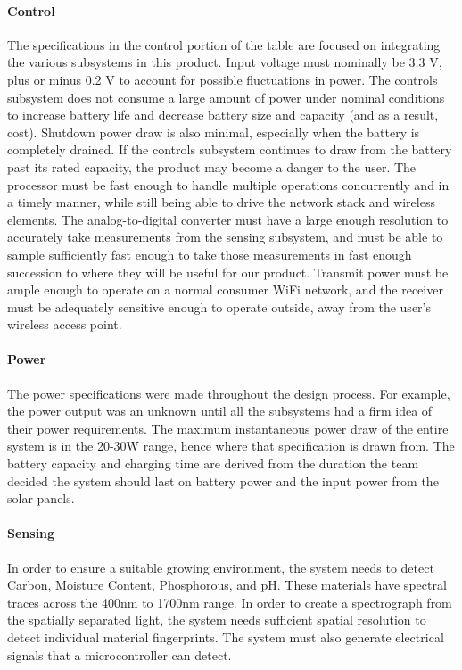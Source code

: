 \paragraph{Control}
The specifications in the control portion of the table are focused on integrating the various subsystems in this product. Input voltage must nominally be 3.3 V, plus or minus 0.2 V to account for possible fluctuations in power. The controls subsystem does not consume a large amount of power under nominal conditions to increase battery life and decrease battery size and capacity (and as a result, cost). Shutdown power draw is also minimal, especially when the battery is completely drained. If the controls subsystem continues to draw from the battery past its rated capacity, the product may become a danger to the user. The processor must be fast enough to handle multiple operations concurrently and in a timely manner, while still being able to drive the network stack and wireless elements. The analog-to-digital converter must have a large enough resolution to accurately take measurements from the sensing subsystem, and must be able to sample sufficiently fast enough to take those measurements in fast enough succession to where they will be useful for our product. Transmit power must be ample enough to operate on a normal consumer WiFi network, and the receiver must be adequately sensitive enough to operate outside, away from the user's wireless access point.

\paragraph{Power}
The power specifications were made throughout the design process. For example, the power output was an unknown until all the subsystems had a firm idea of their power requirements. The maximum instantaneous power draw of the entire system is in the 20-30W range, hence where that specification is drawn from. The battery capacity and charging time are derived from the duration the team decided the system should last on battery power and the input power from the solar panels.

\paragraph{Sensing}
In order to ensure a suitable growing environment, the system needs to detect Carbon, Moisture Content, Phosphorous, and pH. These materials have spectral traces across the 400nm to 1700nm range. In order to create a spectrograph from the spatially separated light, the system needs sufficient spatial resolution to detect individual material fingerprints. The system must also generate electrical signals that a microcontroller can detect.

